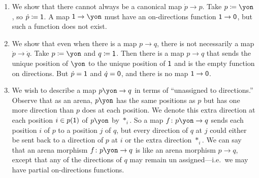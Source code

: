 \documentclass[Book-Poly]{subfiles}
\begin{document}
\begin{exercise}
\begin{solution}
\begin{enumerate}
	\item We show that there cannot always be a canonical map $\dot{p}\to p$.
	Take $p \coloneqq \yon$, so $\dot{p} \coloneqq \textsf{1}$.
	A map $\1 \to \yon$ must have an on-directions function $\textsf{1} \to \textsf{0}$, but such a function does not exist.
	
	\item We show that even when there is a map $p \to q$, there is not necessarily a map $\dot{p}\to\dot{q}$.
	Take $p \coloneqq \yon$ and $q \coloneqq \textsf{1}$.
	Then there is a map $p \to q$ that sends the unique position of $\yon$ to the unique position of $\textsf{1}$ and is the empty function on directions.
	But $\dot{p} = \textsf{1}$ and $\dot{q} = \textsf{0}$, and there is no map $\textsf{1} \to \textsf{0}$.
	
	
	\item We wish to describe a map $p\yon \to q$ in terms of ``unassigned to directions.''
	Observe that as an arena, $p\yon$ has the same positions as $p$ but has one more direction than $p$ does at each position.
	We denote this extra direction at each position $i \in p(\textsf{1})$ of $p\yon$ by $\ast_i$.
	So a map $f \colon p\yon\to q$ sends each position $i$ of $p$ to a position $j$ of $q$, but every direction of $q$ at $j$ could either be sent back to a direction of $p$ at $i$ or the extra direction $\ast_i$.
	We can say that an arena morphism $f \colon p\yon \to q$ is like an arena morphism $p \to q$, except that any of the directions of $q$ may remain un assigned---i.e.\ we may have partial on-directions functions.
\end{enumerate}
\end{solution}
\end{exercise}



\end{document}
